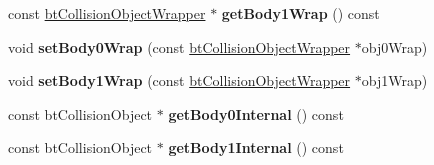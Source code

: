 \begin{DoxyCompactItemize}
const \hyperlink{structbtCollisionObjectWrapper}{bt\+Collision\+Object\+Wrapper} $\ast$ {\bfseries get\+Body1\+Wrap} () const
\item 
\mbox{\label{classbtManifoldResult_a0599942ca5ec1ddf5ea914ce734ba272}} 
void {\bfseries set\+Body0\+Wrap} (const \hyperlink{structbtCollisionObjectWrapper}{bt\+Collision\+Object\+Wrapper} $\ast$obj0\+Wrap)
\item 
\mbox{\label{classbtManifoldResult_a6fd0c696483fd32ab5def0785a9dbc12}} 
void {\bfseries set\+Body1\+Wrap} (const \hyperlink{structbtCollisionObjectWrapper}{bt\+Collision\+Object\+Wrapper} $\ast$obj1\+Wrap)
\item 
\mbox{\label{classbtManifoldResult_a10455cf6b5f6999359852732bf91b4ab}} 
const bt\+Collision\+Object $\ast$ {\bfseries get\+Body0\+Internal} () const
\item 
\mbox{\label{classbtManifoldResult_af872b6f2fc0c82d64d4f35b710bae861}} 
const bt\+Collision\+Object $\ast$ {\bfseries get\+Body1\+Internal} () const
\end{DoxyCompactItemize}
